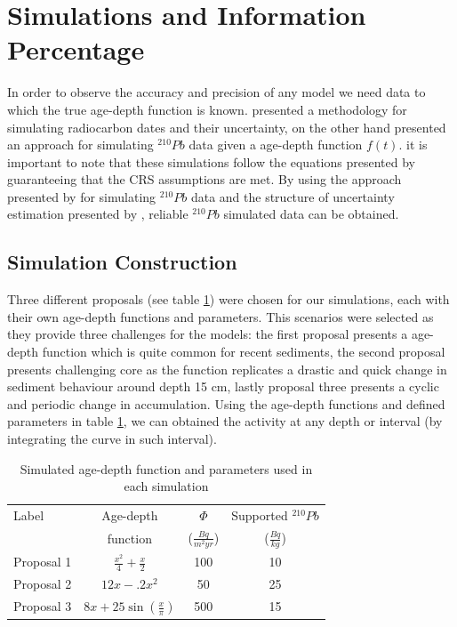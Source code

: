\documentclass [10pt] {article}
\begin{document}
\section{Simulations and Information Percentage}
	In order to observe the accuracy and precision of any model we need data to which the true age-depth function is known.
\citet{Blaauw2018} presented a methodology for simulating radiocarbon dates and their uncertainty, on the other hand \citet{Aquino2018} presented an approach for simulating $^{210}Pb$ data given a age-depth function $f(t)$.
it is important to note that these simulations follow the equations presented by \citet*{Appleby1978,Robbins1978} guaranteeing that the CRS assumptions are met. 
By using the approach presented by \citet{Aquino2018} for simulating $^{210}Pb$ data and the structure of uncertainty estimation presented by \citet{Blaauw2018}, reliable $^{210}Pb$ simulated data can be obtained.

\subsection{Simulation Construction}\label{sec:SimConst}

Three different proposals (see table \ref{tab:sim_param}) were chosen for our simulations, each with their own age-depth functions and parameters. 
This scenarios were selected as they provide three challenges for the models: the first proposal presents a age-depth function which is quite common for recent sediments, the second proposal presents challenging core as the function replicates a drastic and quick change in sediment behaviour around depth 15 cm, lastly proposal three presents a cyclic and periodic change in accumulation. 
Using the age-depth functions and defined parameters in table \ref{tab:sim_param}, we can obtained the activity at any depth or interval (by integrating the curve in such interval).

\begin{table}[!h]
	\centering
	\begin{tabular}{l|ccc}
Label    	& 	Age-depth		&	$ \Phi$		& Supported $^{210}Pb$  \\
		&	function		&	($\frac{Bq}{m^2yr }$)	& ($\frac{Bq}{kg}$) 	\\ \hline
Proposal 1 	&	$\frac{x^2}{4} + \frac{x}{2}$	&	100	& 10	\\
Proposal 2 	&	$12x -.2x^2$			&	50	& 25	\\
Proposal 3 	&	$8x+25\sin(\frac{x}{\pi})$	&	500 	& 15		
	\end{tabular}
	\label{tab:sim_param}
	\caption{Simulated age-depth function and parameters used in each simulation}
 \end{table}
\end{document}
